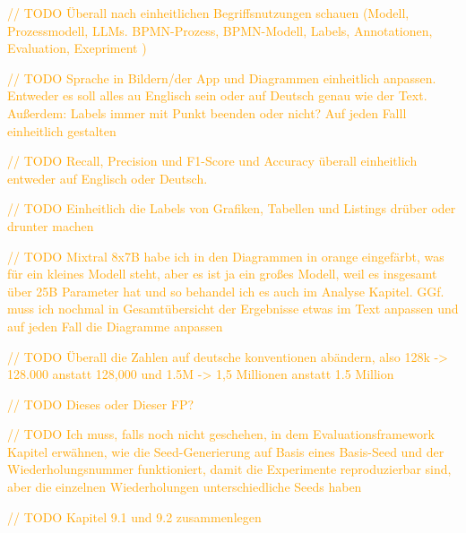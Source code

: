 \textcolor{orange}{// TODO Überall nach einheitlichen Begriffsnutzungen schauen (Modell, Prozessmodell, LLMs. BPMN-Prozess, BPMN-Modell, Labels, Annotationen, Evaluation, Exepriment )}

\textcolor{orange}{// TODO Sprache in Bildern/der App und Diagrammen einheitlich anpassen. Entweder es soll alles au Englisch sein oder auf Deutsch genau wie der Text. Außerdem: Labels immer mit Punkt beenden oder nicht? Auf jeden Falll einheitlich gestalten}

\textcolor{orange}{// TODO Recall, Precision und F1-Score und Accuracy überall einheitlich entweder auf Englisch oder Deutsch.}

\textcolor{orange}{// TODO Einheitlich die Labels von Grafiken, Tabellen und Listings drüber oder drunter machen}

\textcolor{orange}{// TODO Mixtral 8x7B habe ich in den Diagrammen in orange eingefärbt, was für ein kleines Modell steht, aber es ist ja ein großes Modell, weil es insgesamt über 25B Parameter hat und so behandel ich es auch im Analyse Kapitel. GGf. muss ich nochmal in Gesamtübersicht der Ergebnisse etwas im Text anpassen und auf jeden Fall die Diagramme anpassen}

\textcolor{orange}{// TODO Überall die Zahlen auf deutsche konventionen abändern, also 128k -> 128.000 anstatt 128,000 und 1.5M -> 1,5 Millionen anstatt 1.5 Million}

\textcolor{orange}{// TODO Dieses oder Dieser FP?}

\textcolor{orange}{// TODO Ich muss, falls noch nicht geschehen, in dem Evaluationsframework Kapitel erwähnen, wie die Seed-Generierung auf Basis eines Basis-Seed und der Wiederholungsnummer funktioniert, damit die Experimente reproduzierbar sind, aber die einzelnen Wiederholungen unterschiedliche Seeds haben}

\textcolor{orange}{// TODO Kapitel 9.1 und 9.2 zusammenlegen}












